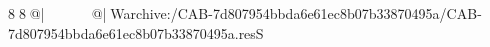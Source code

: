 8  8  @|                                                  @| W   archive:/CAB-7d807954bbda6e61ec8b07b33870495a/CAB-7d807954bbda6e61ec8b07b33870495a.resS 